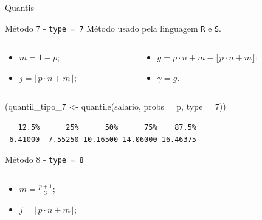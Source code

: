 \documentclass[
  10pt,
  ignorenonframetext,
]{beamer}
\newenvironment{Shaded}{\begin{snugshade}}{\end{snugshade}}
\newcommand{\AttributeTok}[1]{\textcolor[rgb]{0.40,0.45,0.13}{#1}}
\newcommand{\DecValTok}[1]{\textcolor[rgb]{0.68,0.00,0.00}{#1}}
\newcommand{\FunctionTok}[1]{\textcolor[rgb]{0.28,0.35,0.67}{#1}}
\newcommand{\NormalTok}[1]{\textcolor[rgb]{0.00,0.23,0.31}{#1}}
\newcommand{\OtherTok}[1]{\textcolor[rgb]{0.00,0.23,0.31}{#1}}
\providecommand{\tightlist}{%
  \setlength{\itemsep}{0pt}\setlength{\parskip}{0pt}}\usepackage{longtable,booktabs,array}
\begin{document}
\begin{frame}[fragile]{Quantis}
\protect\hypertarget{quantis-5}{}
\begin{block}{Método 7 - \texttt{type\ =\ 7}}
\protect\hypertarget{muxe9todo-7---type-7}{}
Método usado pela linguagem \texttt{R} e \texttt{S}.

\begin{columns}[T]
\begin{column}{0.3\textwidth}
\begin{itemize}
\tightlist
\item
  \(m=1-p\);
\item
  \(j=\lfloor p\cdot n + m \rfloor\);
\end{itemize}
\end{column}

\begin{column}{0.7\textwidth}
\begin{itemize}
\tightlist
\item
  \(g = p\cdot n + m- \lfloor p\cdot n+m \rfloor\);
\item
  \(\gamma = g\).
\end{itemize}
\end{column}
\end{columns}

\begin{Shaded}
\begin{Highlighting}[]
\NormalTok{(quantil\_tipo\_7 }\OtherTok{\textless{}{-}} \FunctionTok{quantile}\NormalTok{(salario, }\AttributeTok{probs =}\NormalTok{ p, }\AttributeTok{type =} \DecValTok{7}\NormalTok{))}
\end{Highlighting}
\end{Shaded}

\begin{verbatim}
   12.5%      25%      50%      75%    87.5% 
 6.41000  7.55250 10.16500 14.06000 16.46375 
\end{verbatim}
\end{block}

\begin{block}{Método 8 - \texttt{type\ =\ 8}}
\protect\hypertarget{muxe9todo-8---type-8}{}
\begin{columns}[T]
\begin{column}{0.5\textwidth}
\begin{itemize}
\tightlist
\item
  \(m=\frac{p+1}{3}\);
\item
  \(j=\lfloor p\cdot n + m \rfloor\);
\end{itemize}
\end{column}


\end{columns}
\end{block}
\end{frame}
\end{document}
